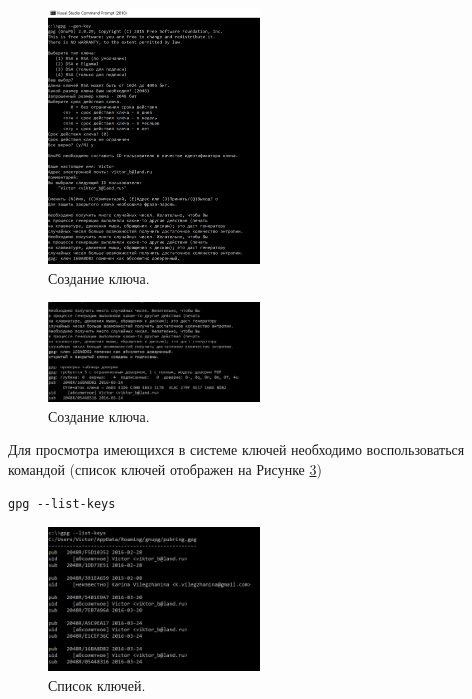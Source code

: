\documentclass[10pt,a4paper]{article}
\begin{document}
\begin{figure}[h]
\begin{center}
\includegraphics[width=0.5\textwidth]{console_create_1} %
\caption{Создание ключа.}
\label{fig:console_create_1}
\end{center}
\end{figure}

\begin{figure}[h]
\begin{center}
\includegraphics[width=0.5\textwidth]{console_create_2} %
\caption{Создание ключа.}
\label{fig:console_create_2}
\end{center}
\end{figure}

Для просмотра имеющихся в системе ключей необходимо воспользоваться командой (список ключей отображен на Рисунке \ref{fig:console_list})
\begin{verbatim}
gpg --list-keys
\end{verbatim}


\begin{figure}[h!]
\begin{center}
\includegraphics[width=0.5\textwidth]{console_list} %
\caption{Список ключей.}
\label{fig:console_list}
\end{center}
\end{figure}
\end{document}
